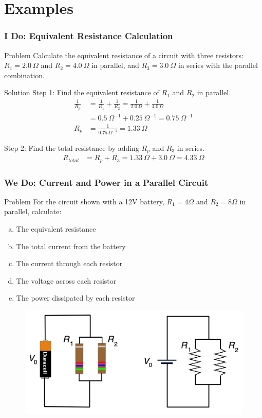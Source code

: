 \documentclass{beamer}
\begin{document}
\section{Examples}
\begin{frame}
    \frametitle{I Do: Equivalent Resistance Calculation}
    \begin{block}{Problem}
        Calculate the equivalent resistance of a circuit with three resistors: $R_1 = 2.0~\Omega$ and $R_2 = 4.0~\Omega$ in parallel, and $R_3 = 3.0~\Omega$ in series with the parallel combination.
    \end{block}
    \begin{block}{Solution}
        Step 1: Find the equivalent resistance of $R_1$ and $R_2$ in parallel.
        \begin{align*}
            \frac{1}{R_p} &= \frac{1}{R_1} + \frac{1}{R_2} = \frac{1}{2.0~\Omega} + \frac{1}{4.0~\Omega}\\
            &= 0.5~\Omega^{-1} + 0.25~\Omega^{-1} = 0.75~\Omega^{-1}\\
            R_p &= \frac{1}{0.75~\Omega^{-1}} = 1.33~\Omega
        \end{align*}
        
        Step 2: Find the total resistance by adding $R_p$ and $R_3$ in series.
        \begin{align*}
            R_{total} &= R_p + R_3 = 1.33~\Omega + 3.0~\Omega = 4.33~\Omega
        \end{align*}
    \end{block}
\end{frame}

\begin{frame}
    \frametitle{We Do: Current and Power in a Parallel Circuit}
    \begin{block}{Problem}
        For the circuit shown with a 12V battery, $R_1 = 4\Omega$ and $R_2 = 8\Omega$ in parallel, calculate:
        \begin{enumerate}[(a)]
            \item The equivalent resistance
            \item The total current from the battery
            \item The current through each resistor
            \item The voltage across each resistor
            \item The power dissipated by each resistor
        \end{enumerate}
    \end{block}
    \begin{figure}
        \centering
        \includegraphics[width=0.5\linewidth]{ParallelCircuitbat.jpg}
    \end{figure}
\end{frame}
\end{document}
